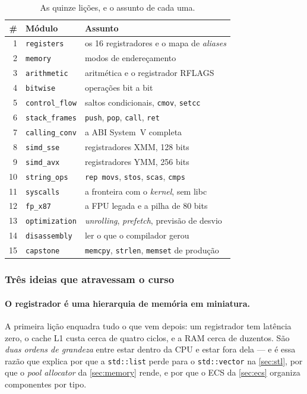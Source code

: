 \begin{table}[htbp]
\centering
\caption{As quinze lições, e o assunto de cada uma.}
\label{tab:asm-course}
\footnotesize
\begin{tabular}{@{}rll@{}}
\toprule
\textbf{\#} & \textbf{Módulo} & \textbf{Assunto} \\
\midrule
1  & \texttt{registers}     & os 16 registradores e o mapa de \emph{aliases} \\
2  & \texttt{memory}        & modos de endereçamento \\
3  & \texttt{arithmetic}    & aritmética e o registrador RFLAGS \\
4  & \texttt{bitwise}       & operações bit a bit \\
5  & \texttt{control\_flow} & saltos condicionais, \texttt{cmov}, \texttt{setcc} \\
6  & \texttt{stack\_frames} & \texttt{push}, \texttt{pop}, \texttt{call}, \texttt{ret} \\
7  & \texttt{calling\_conv} & a ABI System~V completa \\
8  & \texttt{simd\_sse}     & registradores XMM, 128 bits \\
9  & \texttt{simd\_avx}     & registradores YMM, 256 bits \\
10 & \texttt{string\_ops}   & \texttt{rep movs}, \texttt{stos}, \texttt{scas}, \texttt{cmps} \\
11 & \texttt{syscalls}      & a fronteira com o \emph{kernel}, sem libc \\
12 & \texttt{fp\_x87}       & a FPU legada e a pilha de 80 bits \\
13 & \texttt{optimization}  & \emph{unrolling}, \emph{prefetch}, previsão de desvio \\
14 & \texttt{disassembly}   & ler o que o compilador gerou \\
15 & \texttt{capstone}      & \texttt{memcpy}, \texttt{strlen}, \texttt{memset} de produção \\
\bottomrule
\end{tabular}
\end{table}

\subsubsection{Três ideias que atravessam o curso}

\paragraph{O registrador é uma hierarquia de memória em miniatura.} A primeira
lição enquadra tudo o que vem depois: um registrador tem latência zero, o cache
L1 custa cerca de quatro ciclos, e a RAM cerca de duzentos. São \emph{duas ordens
de grandeza} entre estar dentro da CPU e estar fora dela --- e é essa razão que
explica por que a \texttt{std::list} perde para o \texttt{std::vector} na
\cref{sec:stl}, por que o \emph{pool allocator} da \cref{sec:memory} rende, e
por que o ECS da \cref{sec:ecs} organiza componentes por tipo.

